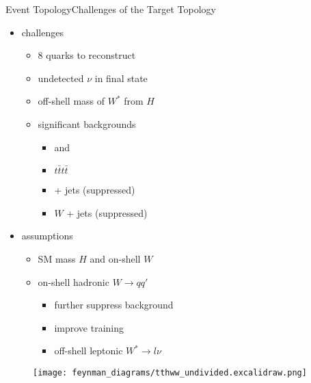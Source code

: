 \documentclass[9pt, aspectratio=169]{beamer}
\begin{document}
\begin{frame}{Event Topology}{Challenges of the Target Topology}
	\begin{minipage}{.58\textwidth}
		\begin{itemize}
			\item challenges
			\begin{itemize}
				\item 8 quarks to reconstruct
				\item undetected $\nu$ in final state
				\item off-shell mass of $W^*$ from $H$
				\item significant backgrounds
				\begin{itemize}
					\item \ttbarZ and \ttbarW
					\item $t\bar{t}t\bar{t}$
					\item \ttbar + jets (suppressed)
					\item $W$ + jets (suppressed)
				\end{itemize}
			\end{itemize}
			\item assumptions
			\begin{itemize}
				\item SM mass $H$ and on-shell $W$
				\item on-shell hadronic $W\rightarrow qq'$
				\begin{itemize}
					\item further suppress background
					\item improve \spanet training
					\item off-shell leptonic $W^*\rightarrow l\nu$
				\end{itemize}
			\end{itemize}
		\end{itemize}
	\end{minipage}
	\begin{minipage}{.4\textwidth}
		\begin{figure}
			\centering
			\texttt{[image: feynman\_diagrams/tthww\_undivided.excalidraw.png]}
		\end{figure}
	\end{minipage}
\end{frame}
\end{document}
